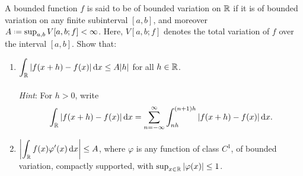 \begin{problem}
  A bounded function \(f\) is said to be of bounded variation on \(\mathbb{R}\)
  if it is of bounded variation on any finite subinterval \([a,b]\), and
  moreover \(A\defeq\sup_{a,b}V[a,b;f]<\infty\). Here, \(V[a,b;f]\) denotes the
  total variation of \(f\) over the interval \([a,b]\). Show that:
\begin{enumerate}[label=(\alph*)]
\item \(\displaystyle\int_{\mathbb{R}}|f(x+h)-f(x)|\mathop{}\!\mathrm{d} x\leq A|h|\) for all
  \(h\in\mathbb{R}\).
  \\\\
  \emph{Hint}: For \(h>0\), write
  \[
    \int_{\mathbb{R}} |f(x+h)-f(x)|\mathop{}\!\mathrm{d} x=
    \sum_{n=-\infty}^\infty\int_{nh}^{(n+1)h}|f(x+h)-f(x)|\mathop{}\!\mathrm{d} x.
  \]
\item
  \(\displaystyle\left|\int_{\mathbb{R}} f(x)\varphi'(x)\mathop{}\!\mathrm{d} x\right|\leq A\),
  where \(\varphi\) is any function of class \(C^1\), of bounded variation,
  compactly supported, with \(\sup_{x\in\mathbb{R}}|\varphi(x)|\leq 1\).
\end{enumerate}
\end{problem}
